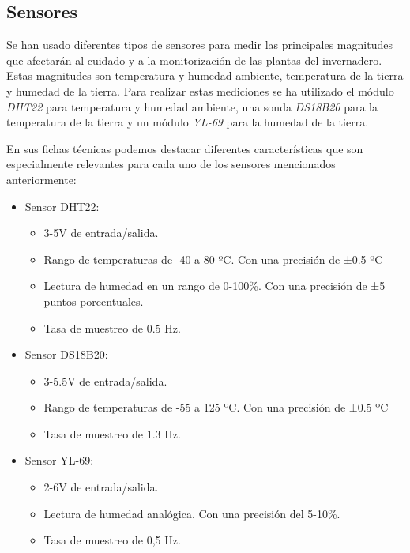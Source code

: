 \documentclass[a4paper, 12pt, oneside]{book}
\begin{document}
\subsection{Sensores}
\label{subsec:sensores}

Se han usado diferentes tipos de sensores para medir las principales magnitudes que afectarán al cuidado y a la monitorización de las plantas del invernadero. Estas magnitudes son temperatura y humedad ambiente, temperatura de la tierra y humedad de la tierra. Para realizar estas mediciones se ha utilizado el módulo \textit{DHT22} para temperatura y humedad ambiente, una sonda \textit{DS18B20} para la temperatura de la tierra y un módulo \textit{YL-69} para la humedad de la tierra.

En sus fichas técnicas podemos destacar diferentes características que son especialmente relevantes para cada uno de los sensores mencionados anteriormente:

\begin{itemize}
	\item Sensor DHT22:
	\begin{itemize}
		\item 3-5V de entrada/salida.
		\item Rango de temperaturas de -40 a 80 ºC. Con una precisión de ±0.5 ºC
		\item Lectura de humedad en un rango de 0-100\%. Con una precisión de ±5 puntos porcentuales.
		\item Tasa de muestreo de 0.5 Hz.
	\end{itemize}
\end{itemize}

\begin{itemize}
	\item Sensor DS18B20:
	\begin{itemize}
		\item 3-5.5V de entrada/salida.
		\item Rango de temperaturas de -55 a 125 ºC. Con una precisión de ±0.5 ºC
		\item Tasa de muestreo de 1.3 Hz.
	\end{itemize}
\end{itemize}

\begin{itemize}
	\item Sensor YL-69:
	\begin{itemize}
		\item 2-6V de entrada/salida.
		\item Lectura de humedad analógica. Con una precisión del 5-10\%.
		\item Tasa de muestreo de 0,5 Hz.
	\end{itemize}
\end{itemize}
\end{document}
